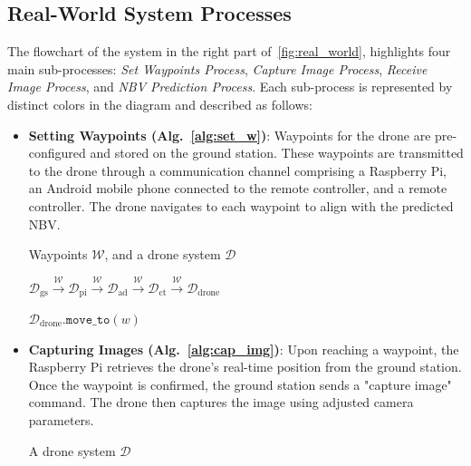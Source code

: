 \subsection{Real-World System Processes}
\label{asec:process}

The flowchart of the system in the right part of~\cref{fig:real_world}, highlights four main sub-processes: \textit{Set Waypoints Process}, \textit{Capture Image Process}, \textit{Receive Image Process}, and \textit{NBV Prediction Process}. 
Each sub-process is represented by distinct colors in the diagram and described as follows:
\begin{itemize}
    \item \textbf{Setting Waypoints (Alg.~\ref{alg:set_w})}: Waypoints for the drone are pre-configured and stored on the ground station. These waypoints are transmitted to the drone through a communication channel comprising a Raspberry Pi, an Android mobile phone connected to the remote controller, and a remote controller. The drone navigates to each waypoint to align with the predicted NBV.

    
\begin{algorithm}[H]
\caption{\textcolor[HTML]{682C99}{Set Waypoints}}
\label{alg:set_w}
\begin{algorithmic}[1]
\Require Waypoints $\mathcal{W}$, and a drone system $\mathcal{D}$

\State $\mathcal{D}_\text{gs} 
\xrightarrow{\mathcal{W}} \mathcal{D}_\text{pi}
\xrightarrow{\mathcal{W}} \mathcal{D}_\text{ad}
\xrightarrow{\mathcal{W}} \mathcal{D}_\text{ct}
\xrightarrow{\mathcal{W}} \mathcal{D}_\text{drone}$

    \State $\mathcal{D}_\text{drone}.\texttt{move\_to}(w)$ 
\EndFor

\end{algorithmic}
\end{algorithm}

    \item \textbf{Capturing Images (Alg.~\ref{alg:cap_img})}: Upon reaching a waypoint, the Raspberry Pi retrieves the drone's real-time position from the ground station. Once the waypoint is confirmed, the ground station sends a "capture image" command. The drone then captures the image using adjusted camera parameters.


\begin{algorithm}[H]
\caption{\textcolor[HTML]{D00402}{Capture Image}}
\label{alg:cap_img}
\begin{algorithmic}[1]
\Require A drone system $\mathcal{D}$


\end{algorithmic}
\end{algorithm}
\end{itemize}
